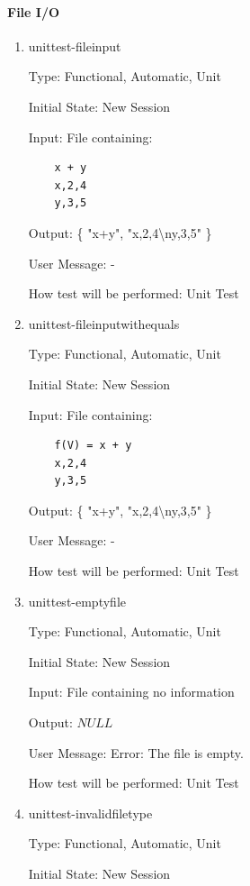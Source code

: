 \documentclass[12pt, titlepage]{article}
\begin{document}
\paragraph{File I/O}
\begin{enumerate}
	
	\item{unittest-fileinput}
	
	Type: Functional, Automatic, Unit
	
	Initial State: New Session
	
	Input: File containing:
	\begin{lstlisting}
	x + y
	x,2,4
	y,3,5
	\end{lstlisting}
	
	Output: \{ "x+y", "x,2,4\textbackslash ny,3,5" \}
	
	User Message: - 
	
	How test will be performed: Unit Test\\
	
	\item{unittest-fileinputwithequals}
	
	Type: Functional, Automatic, Unit
	
	Initial State: New Session
	
	Input: File containing:
	\begin{lstlisting}
	f(V) = x + y
	x,2,4
	y,3,5
	\end{lstlisting}
	
	Output: \{ "x+y", "x,2,4\textbackslash ny,3,5" \}
	
	User Message: - 
	
	How test will be performed: Unit Test\\
	
	\item{unittest-emptyfile}
	
	Type: Functional, Automatic, Unit
	
	Initial State: New Session
	
	Input: File containing no information
	
	Output: $NULL$
	
	User Message: Error: The file is empty.
	
	How test will be performed: Unit Test\\
	
	\item{unittest-invalidfiletype}
	
	Type: Functional, Automatic, Unit
	
	Initial State: New Session
	

\end{enumerate}
\end{document}

